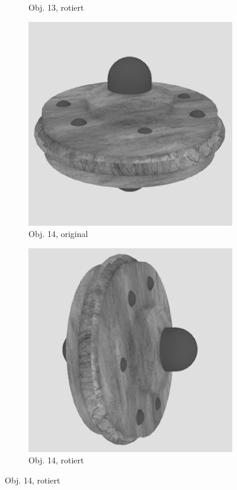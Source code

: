 \begin{figure}
\begin{subfigure}{0.2\textwidth}
\caption{Obj. 13, rotiert} \label{fig:d}
\end{subfigure} \hspace{.5cm}%
\begin{subfigure}{0.2\textwidth}
\includegraphics[width=\linewidth]{Bilder/Objekt14A.png}
\caption{Obj. 14, original} \label{fig:e}
\end{subfigure}\hspace{.5cm}
\begin{subfigure}{0.2\textwidth}
\includegraphics[width=\linewidth]{Bilder/Objekt14B.png}
\caption{Obj. 14, rotiert} \label{fig:f}
\end{subfigure}\hspace{.5cm}


\end{figure}
